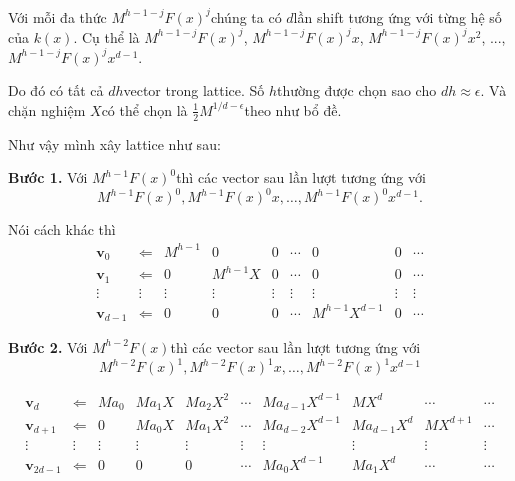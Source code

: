 Với mỗi đa thức $M^{h-1-j} F(x)^j$​ chúng ta có $d$​ lần shift tương ứng với từng hệ số của $k(x)$​. Cụ thể là $M^{h-1-j}F(x)^j$​, $M^{h-1-j}F(x)^j x$​, $M^{h-1-j}F(x)^j x^2$​, ..., $M^{h-1-j}F(x)^j x^{d-1}$​.

Do đó có tất cả $dh$​ vector trong lattice. Số $h$​ thường được chọn sao cho $dh \approx \epsilon$. Và chặn nghiệm $X$​ có thể chọn là $\frac{1}{2}M^{1/d - \epsilon}$​ theo như bổ đề.

Như vậy mình xây lattice như sau:

\textbf{Bước 1.} Với $M^{h-1} F(x)^0$​ thì các vector sau lần lượt tương ứng với
\begin{equation*}
    M^{h-1} F(x)^0, M^{h-1} F(x)^0 x, \ldots, M^{h-1} F(x)^0 x^{d-1}.
\end{equation*}

Nói cách khác thì
\begin{equation*}
    \begin{array}{ccccccccc}
    \bm{v}_0 & \Leftarrow & M^{h-1} & 0 & 0 & \cdots & 0 & 0 & \cdots \\
    \bm{v}_1 & \Leftarrow & 0 & M^{h-1} X & 0 & \cdots & 0 & 0 & \cdots \\
    \vdots & \vdots & \vdots & \vdots & \vdots & \vdots & \vdots & \vdots & \vdots \\
    \bm{v}_{d-1} & \Leftarrow & 0 & 0 & 0 & \cdots & M^{h-1} X^{d-1} & 0 & \cdots
    \end{array}
\end{equation*}

\textbf{Bước 2.} Với $M^{h-2} F(x)$​ thì các vector sau lần lượt tương ứng với
\begin{equation*}
    M^{h-2} F(x)^1, M^{h-2} F(x)^1 x, \ldots, M^{h-2} F(x)^1 x^{d-1}
\end{equation*}

\begin{equation*}
    \begin{array}{cccccccccc}
        \bm{v}_d & \Leftarrow & Ma_0 & M a_1 X & M a_2 X^2 & \cdots & M a_{d-1} X^{d-1} & M X^d & \cdots & \cdots \\ 
        \bm{v}_{d+1} & \Leftarrow & 0 & Ma_0 X & Ma_1 X^2 & \cdots & M a_{d-2} X^{d-1} & M a_{d-1} X^d & M X^{d+1} & \cdots \\
        \vdots & \vdots & \vdots & \vdots & \vdots & \vdots & \vdots & \vdots & \vdots & \vdots \\
        \bm{v}_{2d-1} & \Leftarrow & 0 & 0 & 0 & \cdots & M a_0 X^{d-1} & M a_1 X^d & \cdots & \cdots
    \end{array}
\end{equation*}

